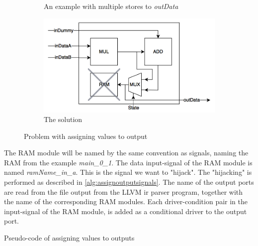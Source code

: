 \begin{figure}[hbpt]
\begin{subfigure}{0.49\textwidth}
                \caption{An example with multiple stores to \textit{outData}}
  \label{fig:assignoutputs3}
       \end{subfigure}%
    \hfill
        \begin{subfigure}{0.49\textwidth}\centering
                    \includegraphics[width=\linewidth]{figs/OutputAssignment4.png}
                \caption{The solution}
  \label{fig:assignoutputs4}
       \end{subfigure}%
\caption{\label{fig:assigningoutputs}Problem with assigning values to output}
\end{figure}
The RAM module will be named by the same convention as signals, naming the RAM from the example \textit{main\_0\_1}. The data input-signal of the RAM module is named \textit{ramName\_in\_a}. This is the signal we want to "hijack". The "hijacking" is performed as described in \cref{alg:assignoutputsignals}. The name of the output ports are read from the file output from the LLVM \gls{ir} parser program, together with the name of the corresponding RAM modules. Each driver-condition pair in the input-signal of the RAM module, is added as a conditional driver to the output port.
\makeatletter
\let\OldStatex\Statex
\renewcommand{\Statex}[1][3]{%
  \setlength\@tempdima{\algorithmicindent}%
  \OldStatex\hskip\dimexpr#1\@tempdima\relax}
\makeatother
\begin{algorithm}
  \caption{Pseudo-code of assigning values to outputs
  \label{alg:assignoutputsignals}}
\end{algorithm}

